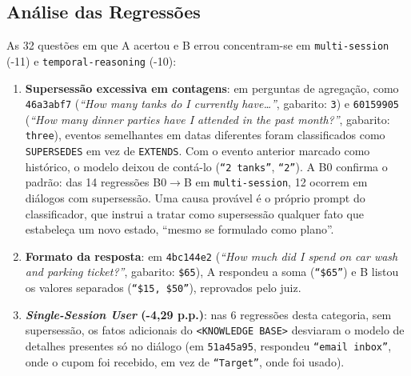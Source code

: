 \documentclass[10pt,conference,twocolumn]{IEEEtran}
\begin{document}
\subsection{Análise das Regressões}
As 32 questões em que A acertou e B errou concentram-se em \texttt{multi-session} (-11) e \texttt{temporal-reasoning} (-10):
\begin{enumerate}
    \item \textbf{Supersessão excessiva em contagens}: em perguntas de agregação, como \texttt{46a3abf7} (\textit{``How many tanks do I currently have\ldots''}, gabarito: \texttt{3}) e \texttt{60159905} (\textit{``How many dinner parties have I attended in the past month?''}, gabarito: \texttt{three}), eventos semelhantes em datas diferentes foram classificados como \texttt{SUPERSEDES} em vez de \texttt{EXTENDS}. Com o evento anterior marcado como histórico, o modelo deixou de contá-lo (\texttt{``2 tanks''}, \texttt{``2''}). A B0 confirma o padrão: das 14 regressões B0$\rightarrow$B em \texttt{multi-session}, 12 ocorrem em diálogos com supersessão. Uma causa provável é o próprio prompt do classificador, que instrui a tratar como supersessão qualquer fato que estabeleça um novo estado, ``mesmo se formulado como plano''.
    \item \textbf{Formato da resposta}: em \texttt{4bc144e2} (\textit{``How much did I spend on car wash and parking ticket?''}, gabarito: \texttt{\$65}), A respondeu a soma (\texttt{``\$65''}) e B listou os valores separados (\texttt{``\$15, \$50''}), reprovados pelo juiz.
    \item \textbf{\textit{Single-Session User} (-4,29 p.p.)}: nas 6 regressões desta categoria, sem supersessão, os fatos adicionais do \texttt{<KNOWLEDGE BASE>} desviaram o modelo de detalhes presentes só no diálogo (em \texttt{51a45a95}, respondeu \texttt{``email inbox''}, onde o cupom foi recebido, em vez de \texttt{``Target''}, onde foi usado).
\end{enumerate}
\end{document}
